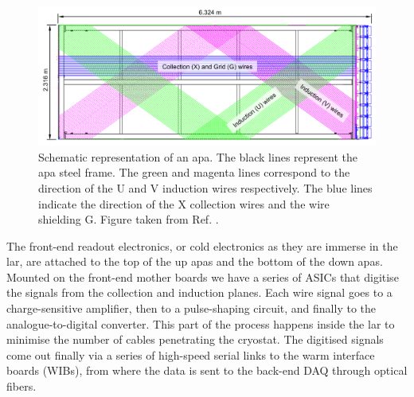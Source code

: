 \begin{figure}[t]
	\centering
	\includegraphics[width=1\linewidth]{Images/DUNE/FD/APA_wires}
	\caption[Schematic representation of an \gls{apa} frames showing the U, V, X and G wires.]{Schematic representation of an \gls{apa}. The black lines represent the \gls{apa} steel frame. The green and magenta lines correspond to the direction of the U and V induction wires respectively. The blue lines indicate the direction of the X collection wires and the wire shielding G. Figure taken from Ref. \cite{DUNE2020TDR1}.}
	\label{fig:apa}
\end{figure}

The front-end readout electronics, or cold electronics as they are immerse in the \gls{lar}, are attached to the top of the up \gls{apa}s and the bottom of the down \gls{apa}s. Mounted on the front-end mother boards we have a series of ASICs that digitise the signals from the collection and induction planes. Each wire signal goes to a charge-sensitive amplifier, then to a pulse-shaping circuit, and finally to the analogue-to-digital converter. This part of the process happens inside the \gls{lar} to minimise the number of cables penetrating the cryostat. The digitised signals come out finally via a series of high-speed serial links to the warm interface boards (WIBs), from where the data is sent to the back-end DAQ through optical fibers.

